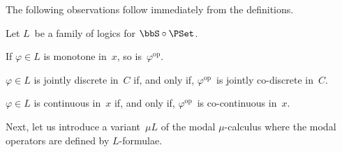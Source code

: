 \documentclass[10pt, fleqn]{scrartcl}
\newcommand*{\op}{\mathrm{op}}
\newcommand*{\?}{\kern .08em}
\begin{document}
The following observations follow immediately from the definitions.
\begin{Lem}
Let $L$~be a family of logics for $\bbS \circ \PSet$.
\begin{enuma}
\item If $\varphi \in L$ is monotone in~$x$, so is~$\varphi^\op$.
\item $\varphi \in L$ is jointly discrete in~$C$ if, and only if, $\varphi^\op$~is
  jointly co-discrete in~$C$.
\item $\varphi \in L$ is continuous in~$x$ if, and only if, $\varphi^\op$~is co-continuous
  in~$x$.
\end{enuma}
\end{Lem}

Next, let us introduce a variant~$\mu L$ of the modal $\mu$-calculus where the modal operators
are defined by $L$-formulae.
\end{document}
